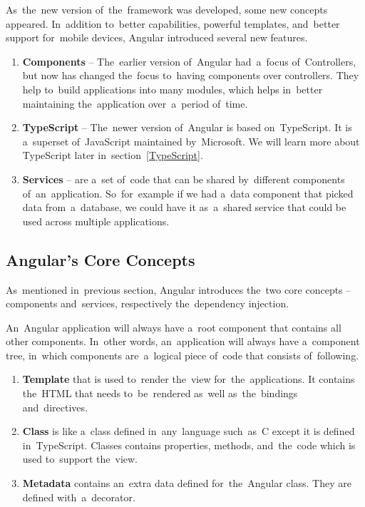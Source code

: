 As~the~new version of~the~framework was developed, some new concepts appeared.
In~addition to~better  capabilities, powerful templates,
and~better support for~mobile devices, Angular introduced several new features.

\begin{enumerate}
  \item \textbf{Components} -- The~earlier version of~Angular had~a~focus
  of~Controllers, but now has changed the~focus to~having components over
  controllers. They help to~build applications into many modules, which
  helps in~better maintaining the~application over~a~period of~time.
  \item \textbf{TypeScript} -- The~newer version of~Angular is based
  on~TypeScript. It is a~superset of~JavaScript maintained by~Microsoft. We will
  learn more about TypeScript later in~section~\ref{TypeScript}.
  \item \textbf{Services} -- are a~set of~code that can be shared by~different
  components of~an~application. So~for~example if we had a~data component that
  picked data from~a~database, we could have it as~a~shared service that could
  be used across multiple applications.
\end{enumerate}

\subsection{Angular's Core Concepts}
As~mentioned in~previous section, Angular introduces the~two core concepts --
components and~services, respectively the~dependency injection.

An~Angular application will always have a~root component that contains all other
components. In~other words, an~application will always have a~component tree,
in~which components are~a~logical piece of~code that consists of~following.

\begin{enumerate}
  \item \textbf{Template} that is used to~render the~view for~the~applications.
  It contains the~HTML that needs to~be~rendered as~well as~the~bindings
  and~directives.
  \item \textbf{Class} is like a~class defined in~any~language such~as~C except
  it is defined in~TypeScript. Classes contains properties, methods,
  and~the~code which is used to~support the~view.
  \item \textbf{Metadata} contains an~extra data defined for~the~Angular class.
  They are defined with~a~decorator.
\end{enumerate}


